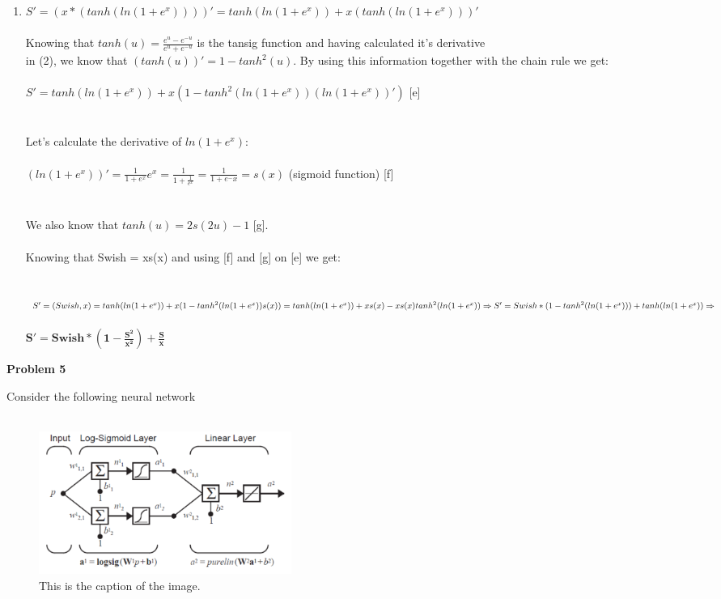 \documentclass{article}
\begin{document}
\begin{enumerate}
  \item $S' = (x*(tanh(ln(1+e^{x}))))' = tanh(ln(1+e^{x})) + x(tanh(ln(1+e^{x})))'$ \\ \\ Knowing that $tanh(u) = \frac{e^{u}-e^{-u}}{e^{u}+e^{-u}}$ is the tansig function and having calculated it's derivative \\ 
  in (2), we know that $(tanh(u))' = 1 - tanh^2(u)$. By using this information together with the chain rule we get: \\ \\ $S' = tanh(ln(1+e^{x})) + x(1 - tanh^2(ln(1+e^{x}))(ln(1+e^{x}))')$ \hspace{0.5cm} [e] \\ \\ \\
  Let's calculate the derivative of $ln(1+e^{x})$: \\ \\$(ln(1+e^{x}))' = \frac{1}{1+e^{x}}e^x = \frac{1}{1+\frac{1}{e^x}} = \frac{1}{1+e^-x} = s(x)$ (sigmoid function)\hspace{0.3cm} [f]\\ \\ \\We also know that
  $tanh(u) = 2s(2u)-1$ \hspace{0.3cm} [g]. \\ \\ Knowing that Swish = xs(x) and using [f] and [g] on [e] we get: \\ \\ \\$S' = (Swish,x) = tanh(ln(1+e^{x})) + x(1 - tanh^2(ln(1+e^{x}))s(x)) =\\ \\ tanh(ln(1+e^{x})) + xs(x) - xs(x)tanh^2(ln(1+e^{x}))
  \Rightarrow \\ \\{S' = Swish*(1 - tanh^2(ln(1+e^{x}))) +tanh(ln(1+e^{x})) \Rightarrow}$ \\ \\$\bm{S' = Swish*(1-\frac{S^2}{x^2}) + \frac{S}{x}}$
\end{enumerate}

\newpage
\noindent \textbf{Problem 5}

\noindent Consider the following neural network \\ \\
\begin{figure}[h]
  \centering
  \includegraphics[width=0.4\textwidth]{pr5_a.png}
  \caption{This is the caption of the image.}
\end{figure}
\end{document}
